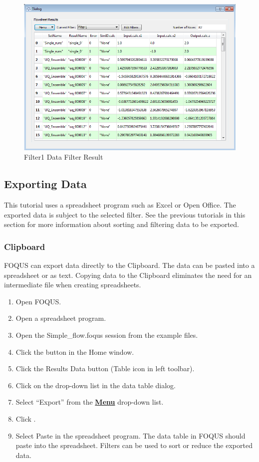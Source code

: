 \begin{figure}[H]
	\begin{center}
		\includegraphics[scale=0.55]{Chapt_flowsheet/figs/filter_3_result}
		\caption{Filter1 Data Filter Result}
		\label{fig.filter.3.result}
	\end{center}
\end{figure}

\subsection{Exporting Data}

This tutorial uses a spreadsheet program such as Excel or Open Office. The exported data is subject to the selected filter. See the previous tutorials in this section for more information about sorting and filtering data to be exported.

\subsubsection{Clipboard}

FOQUS can export data directly to the Clipboard. The data can be pasted into a spreadsheet or as text. Copying data to the Clipboard eliminates the need for an intermediate file when creating spreadsheets.

\begin{enumerate}
 	\item Open FOQUS.
 	\item Open a spreadsheet program.
 	\item Open the Simple\_flow.foqus session from the example files.
 	\item Click the  button in the Home window.
 	\item Click the Results Data button (Table icon in left toolbar).
 	\item Click on the  drop-down list in the data table dialog.
 	\item Select ``Export'' from the \textbf{\underline{Menu}} drop-down list.
 	\item Click .
 	\item Select Paste in the spreadsheet program. The data table in FOQUS should paste into the spreadsheet. Filters can be used to sort or reduce the exported data.
\end{enumerate}


